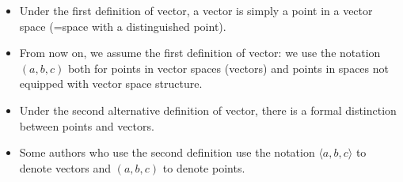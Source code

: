 \begin{frame}
\begin{itemize}
\item<3-> Under the first definition of vector, a vector is simply a point in a vector space (=space with a distinguished point).
\item<4-> From now on, we assume the first definition of vector: we use the notation $(a,b,c)$ both for points in vector spaces (vectors) and points in spaces not equipped with vector space structure.
\item<5-> Under the second alternative definition of vector, there is a formal distinction between points and vectors.
\item<6-> Some authors who use the second definition use the notation $\langle a, b, c \rangle$ to denote vectors and $(a,b,c)$ to denote points.
\end{itemize}
\end{frame}
